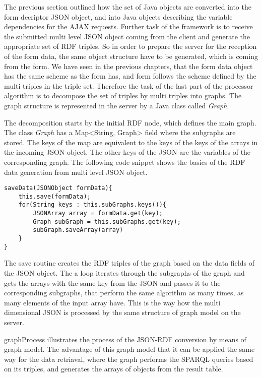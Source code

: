 The previous section outlined how the set of Java objects are converted into the form decriptor JSON object, and into Java objects describing the variable dependencies for the AJAX requests. Further task of the framework is to receive the submitted multi level JSON object coming from the client and generate the appropriate set of RDF triples. So in order to prepare the server for the reception of the form data, the same object structure have to be generated, which is coming from the form. We have seen in the previous chapters, that the form data object has the same scheme as the form has, and form follows the scheme defined by the multi triples in the triple set. Therefore the task of the last part of the processor algorithm is to decompose the set of triples by multi triples into graphs. The graph structure is represented in the server by a Java class called \textit{Graph}. 


The decomposition starts by the initial RDF node, which defines the main graph. The class \textit{Graph} has a Map<String, Graph> field where the subgraphs are stored. The keys of the map are equivalent to the keys of the keys of the arrays in the incoming JSON object. The other keys of the JSON are the variables of the corresponding graph. The following code snippet shows the basics of the RDF data generation from multi level JSON object. 

\begin{lstlisting}[basicstyle=\footnotesize, frame=single, caption={Subform descriptor}, label=dataGeneration captionpos=b, belowskip=1em, aboveskip=2em]
saveData(JSONObject formData){
	this.save(formData);
	for(String keys : this.subGraphs.keys()){
		JSONArray array = formData.get(key);
		Graph subGraph = this.subGraphs.get(key);
		subGraph.saveArray(array)					
	}
}
\end{lstlisting}

The save routine creates the RDF triples of the graph based on the data fields of the JSON object. The a loop iterates through the subgraphs of the graph and gets the arrays with the same key from the JSON and passes it to the corresponding subgraphs, that perform the same algorithm as many times, as many elements of the input array have. This is the way how the multi dimensional JSON is processed by the same structure of graph model on the server. 

\figurename{graphProcess} illustrates the process of the JSON-RDF conversion by means of graph model. The advantage of this graph model that it can be applied the same way for the data retriaval, where the graph performs the SPARQL queries based on its triples, and generates the arrays of objects from the result table. 


